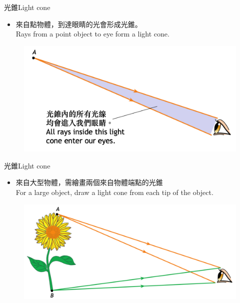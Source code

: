 \documentclass[beamer=true]{standalone}
\begin{document}
\begin{frame}{光錐Light cone}
    \begin{itemize}
        \item 來自點物體，到達眼睛的光會形成光錐。\\Rays from a point object to eye form a light cone.
    \end{itemize}\bigskip
\begin{figure}
    \centering
    \includegraphics[width=0.6\linewidth]{assets/qwdoiwjidwqiodjioqwdijoqwjdo.png}
    
    
\end{figure}
    
\end{frame}

\begin{frame}{光錐Light cone}
\begin{itemize}
    \item 來自大型物體，需繪畫兩個來自物體端點的光錐\\For a large object, draw a light cone from each tip of the object.
\end{itemize}\bigskip
    \begin{figure}
        \centering
        \includegraphics[width=0.75\linewidth]{assets/dwqdjwqdiwqjdoiqwoi1.png}
    \end{figure}
\end{frame}
\end{document}
